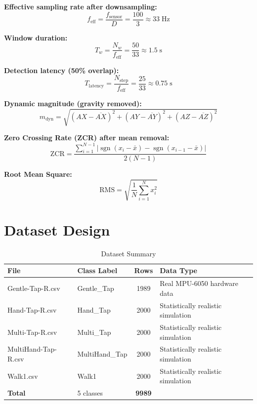 \documentclass[12pt,a4paper]{report}
\begin{document}
\textbf{Effective sampling rate after downsampling:}
\begin{equation}
  f_{\text{eff}} = \frac{f_{\text{sensor}}}{D} = \frac{100}{3} \approx 33\;\text{Hz}
  \label{eq:fs}
\end{equation}

\textbf{Window duration:}
\begin{equation}
  T_w = \frac{N_w}{f_{\text{eff}}} = \frac{50}{33} \approx 1.5\;\text{s}
  \label{eq:tw}
\end{equation}

\textbf{Detection latency (50\% overlap):}
\begin{equation}
  T_{\text{latency}} = \frac{N_{\text{step}}}{f_{\text{eff}}} = \frac{25}{33} \approx 0.75\;\text{s}
  \label{eq:lat}
\end{equation}

\textbf{Dynamic magnitude (gravity removed):}
\begin{equation}
  m_{\text{dyn}} = \sqrt{(AX-\overline{AX})^2 + (AY-\overline{AY})^2 + (AZ-\overline{AZ})^2}
  \label{eq:dynmag}
\end{equation}

\textbf{Zero Crossing Rate (ZCR) after mean removal:}
\begin{equation}
  \text{ZCR} = \frac{\sum_{i=1}^{N-1}
    \bigl|\operatorname{sgn}(x_i - \bar{x}) - \operatorname{sgn}(x_{i-1} - \bar{x})\bigr|}
    {2(N-1)}
  \label{eq:zcr}
\end{equation}

\textbf{Root Mean Square:}
\begin{equation}
  \text{RMS} = \sqrt{\frac{1}{N}\sum_{i=1}^{N} x_i^2}
  \label{eq:rms}
\end{equation}

\section{Dataset Design}

\begin{table}[H]
  \centering
  \caption{Dataset Summary}
  \label{tab:dataset}
  \begin{tabular}{llcl}
    \toprule
    \textbf{File} & \textbf{Class Label} & \textbf{Rows} & \textbf{Data Type} \\
    \midrule
    Gentle-Tap-R.csv    & Gentle\_Tap    & 1989 & Real MPU-6050 hardware data \\
    Hand-Tap-R.csv      & Hand\_Tap      & 2000 & Statistically realistic simulation \\
    Multi-Tap-R.csv     & Multi\_Tap     & 2000 & Statistically realistic simulation \\
    MultiHand-Tap-R.csv & MultiHand\_Tap & 2000 & Statistically realistic simulation \\
    Walk1.csv           & Walk1          & 2000 & Statistically realistic simulation \\
    \midrule
    \textbf{Total}      & 5 classes      & \textbf{9989} & \\
    \bottomrule
  \end{tabular}
\end{table}
\end{document}
